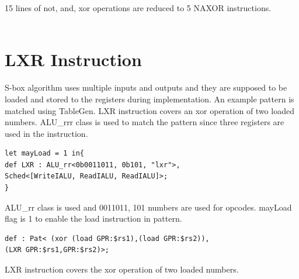 15 lines of not, and, xor operations are reduced to 5 NAXOR instructions.
\\\\






\section{LXR Instruction}

S-box algorithm uses multiple inputs and outputs and they are supposed to be loaded and stored to the registers during implementation. An example pattern is matched using TableGen. LXR instruction covers an xor operation of two loaded numbers. ALU\_rrr class is used to match the pattern since three registers are used in the instruction.

\begin{lstlisting}
let mayLoad = 1 in{
def LXR : ALU_rr<0b0011011, 0b101, "lxr">,
Sched<[WriteIALU, ReadIALU, ReadIALU]>;
}
\end{lstlisting}

ALU\_rr class is used and 0011011, 101 numbers are used for opcodes. mayLoad flag is 1 to enable the load instruction in pattern.
\\
\begin{lstlisting}
def : Pat< (xor (load GPR:$rs1),(load GPR:$rs2)),
(LXR GPR:$rs1,GPR:$rs2)>;
\end{lstlisting}

LXR instruction covers the xor operation of two loaded numbers.
\\

